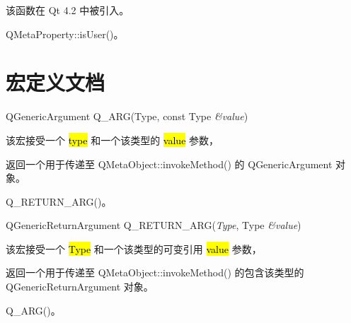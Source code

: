 该函数在 Qt 4.2 中被引入。

\begin{notice}[另请参阅]
QMetaProperty::isUser()。
\end{notice}

\section{宏定义文档}

QGenericArgument Q\_ARG(Type, const Type \emph{\&value})

该宏接受一个 \hl{type} 和一个该类型的 \hl{value} 参数，

返回一个用于传递至 QMetaObject::invokeMethod() 的 QGenericArgument 对象。

\begin{notice}[另请参阅]
Q\_RETURN\_ARG()。
\end{notice} 

QGenericReturnArgument Q\_RETURN\_ARG(\emph{Type}, Type \emph{\&value})

该宏接受一个 \hl{Type} 和一个该类型的可变引用 \hl{value} 参数，

返回一个用于传递至 QMetaObject::invokeMethod() 的包含该类型的 QGenericReturnArgument 对象。

\begin{notice}[另请参阅]
Q\_ARG()。
\end{notice} 